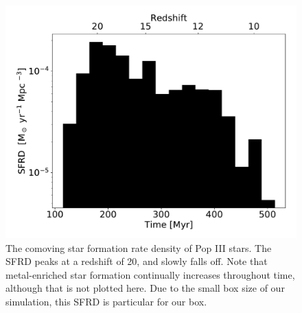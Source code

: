 \documentclass[fleqn,usenatbib]{mnras}
\begin{document}
\begin{figure}
	\includegraphics[width=\columnwidth]{images/pop3_SFR_bar.pdf}
    \caption{The comoving star formation rate density of Pop III stars. The SFRD peaks at a redshift of 20, and slowly falls off. Note that metal-enriched star formation continually increases throughout time, although that is not plotted here. Due to the small box size of our simulation, this SFRD is particular for our box.}
    \label{fig:pop3_SFR_bar}
\end{figure}

\end{document}
